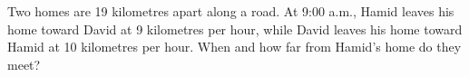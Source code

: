 Two homes are 19 kilometres apart along a road. At 9:00 a.m., Hamid leaves his home toward David at 9 kilometres per hour, while David leaves his home toward Hamid at 10 kilometres per hour. When and how far from Hamid's home do they meet?
